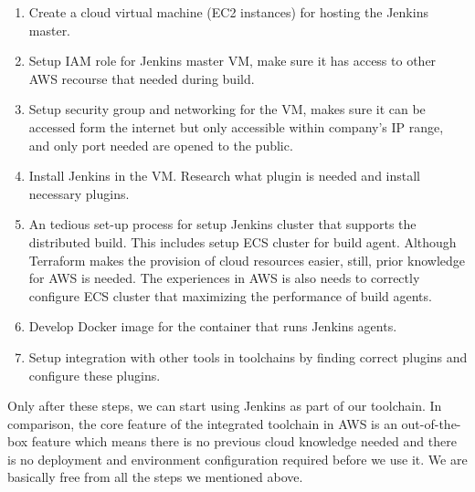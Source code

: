 \begin{enumerate} 
 \item Create a cloud virtual machine (EC2 instances) for hosting the Jenkins master.
 \item Setup IAM role for Jenkins master VM, make sure it has access to other AWS recourse that needed during build.
 \item Setup security group and networking for the VM, makes sure it can be accessed form the internet but only accessible within company's IP range, and only port needed are opened to the public.
 \item Install Jenkins in the VM. Research what plugin is needed and install necessary plugins.
 \item An tedious set-up process for setup Jenkins cluster that supports the distributed build. This includes setup ECS cluster for build agent. Although Terraform makes the provision of cloud resources easier, still, prior knowledge for AWS is needed. The experiences in AWS is also needs to correctly configure ECS cluster that maximizing the performance of build agents.
 \item Develop Docker image for the container that runs Jenkins agents.
 \item Setup integration with other tools in toolchains by finding correct plugins and configure these plugins. 
\end{enumerate}
Only after these steps, we can start using Jenkins as part of our toolchain.
In comparison, the core feature of the integrated toolchain in AWS is an out-of-the-box feature which means there is no previous cloud knowledge needed and there is no deployment and environment configuration required before we use it. We are basically free from all the steps we mentioned above.
